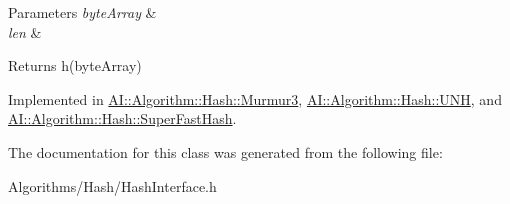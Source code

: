 \begin{DoxyParams}{Parameters}
{\em byte\-Array} & \\
\hline
{\em len} & \\
\hline
\end{DoxyParams}
\begin{DoxyReturn}{Returns}
h(byte\-Array) 
\end{DoxyReturn}


Implemented in \hyperlink{classAI_1_1Algorithm_1_1Hash_1_1Murmur3_ab79d4cbd685e34c88077d58e5cacf7a3}{A\-I\-::\-Algorithm\-::\-Hash\-::\-Murmur3}, \hyperlink{classAI_1_1Algorithm_1_1Hash_1_1UNH_acc52e3c2f323e748882ee5d9d66be698}{A\-I\-::\-Algorithm\-::\-Hash\-::\-U\-N\-H}, and \hyperlink{classAI_1_1Algorithm_1_1Hash_1_1SuperFastHash_a242ccb7975bd45b30a945d9649170629}{A\-I\-::\-Algorithm\-::\-Hash\-::\-Super\-Fast\-Hash}.



The documentation for this class was generated from the following file\-:\begin{DoxyCompactItemize}
\item 
Algorithms/\-Hash/Hash\-Interface.\-h\end{DoxyCompactItemize}
